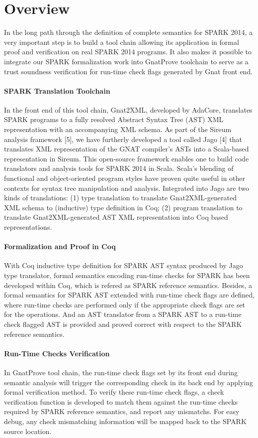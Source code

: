 \section{Overview}
In the long path through the definition of complete semantics for SPARK 2014, a
very important step is to build a tool chain allowing its application in formal
proof and verification on real SPARK 2014 programs. It also makes it possible to
integrate our SPARK formalization work into GnatProve toolchain to serve as
a trust soundness verification for run-time check flags generated by Gnat
front end.

\paragraph{SPARK Translation Toolchain}
In the front end of this tool chain, Gnat2XML, developed by AdaCore, translates
SPARK programs to a fully resolved Abstract Syntax Tree (AST) XML representation
with an accompanying XML schema. As part of the Sireum analysis framework [5],
we have furtherly developed a tool called Jago [4] that translates XML
representation of the GNAT compiler's ASTs into a Scala-based representation in
Sireum. This open-source framework enables one to build code translators and
analysis tools for SPARK 2014 in Scala. Scala’s blending of functional and
object-oriented program styles have proven quite useful in other contexts for
syntax tree manipulation and analysis. Integrated into Jago are two kinds of
translations: (1) type translation to translate Gnat2XML-generated XML schema to
(inductive) type definition in Coq; (2) program translation to translate
Gnat2XML-generated AST XML representation into Coq based representations.

\paragraph{Formalization and Proof in Coq}
With Coq inductive type definition for SPARK AST syntax produced by Jago type
translator, formal semantics encoding run-time checks for SPARK has
been developed within Coq, which is refered as SPARK reference semantics.
Besides, a formal semantics for SPARK AST extended with run-time check flags
are defined, where run-time checks are performed only if the appropriate check
flags are set for the operations. And an AST translator from a SPARK AST to a
run-time check flagged AST is provided and proved correct with respect to the
SPARK reference semantics.

\paragraph{Run-Time Checks Verification}
In GnatProve tool chain, the run-time check flags set by its front end during
semantic analysis will trigger the corresponding check in its back end by
applying formal verification method. To verify these run-time check flags, a
check verification function is developed to match them against the
run-time checks required by SPARK reference semantics, and report any mismatchs.
For easy debug, any check mismatching information will be mapped back to the
SPARK source location.



